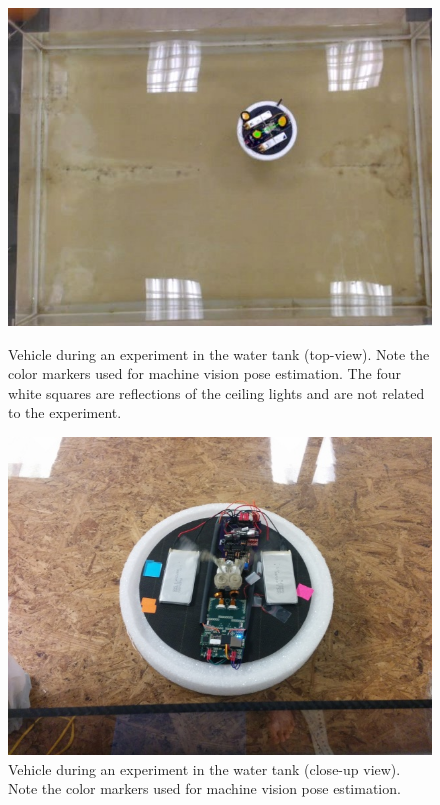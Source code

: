 \begin{figure}
\centering
{}
\includegraphics[width=\textwidth]{Files/Figures/watertank.jpg}
\caption[Vehicle during an experiment in the water tank (top-view)]{Vehicle during an experiment in the water tank (top-view). Note the color markers used for machine vision pose estimation. The four white squares are reflections of the ceiling lights and are not related to the experiment.}
\label{fig_robotInActionTop}
\endminipage\hfill
{}
\includegraphics[width=\textwidth]{Files/Figures/robot2.jpg}
\caption[Vehicle during an experiment in the water tank (close-up view)]{Vehicle during an experiment in the water tank (close-up view). Note the color markers used for machine vision pose estimation.\newline \newline}
\label{fig_robotInActionClose}
\endminipage\hfill
\end{figure}

